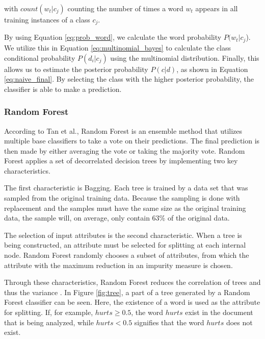         with $count(w_t|c_j)$ counting the number of times a word $w_t$ appears in all training instances of a class $c_j$.
        
        By using Equation \eqref{eq:prob_word}, we calculate the word probability $P(w_t|c_j$). We utilize this in Equation \eqref{eq:multinomial_bayes} to calculate the class conditional probability $P(d_i|c_j)$ using the multinomial distribution. Finally, this allows us to estimate the posterior probability $P(c|d)$, as shown in Equation \eqref{eq:naive_final}. By selecting the class with the higher posterior probability, the classifier is able to make a prediction.
        
\subsubsection{Random Forest}
        According to Tan et al., Random Forest is an ensemble method that utilizes multiple base classifiers to take a vote on their predictions. The final prediction is then made by either averaging the vote or taking the majority vote. Random Forest applies a set of decorrelated decision trees by implementing two key characteristics.
        
        The first characteristic is Bagging. Each tree is trained by a data set that was sampled from the original training data. Because the sampling is done with replacement and the samples must have the same size as the original training data, the sample will, on average, only contain 63\% of the original data.
        
        The selection of input attributes is the second characteristic. When a tree is being constructed, an attribute must be selected for splitting at each internal node.
        Random Forest randomly chooses a subset of attributes, from which the attribute with the maximum reduction in an impurity measure is chosen.
        
        Through these characteristics, Random Forest reduces the correlation of trees and thus the variance \cite{DBLP:books/aw/TanSKK2019}. In Figure \ref{fig:tree}, a part of a tree generated by a Random Forest classifier can be seen. Here, the existence of a word is used as the attribute for splitting. If, for example, $hurts \geq 0.5$, the word $hurts$ exist in the document that is being analyzed, while $hurts < 0.5$ signifies that the word $hurts$ does not exist.
        

